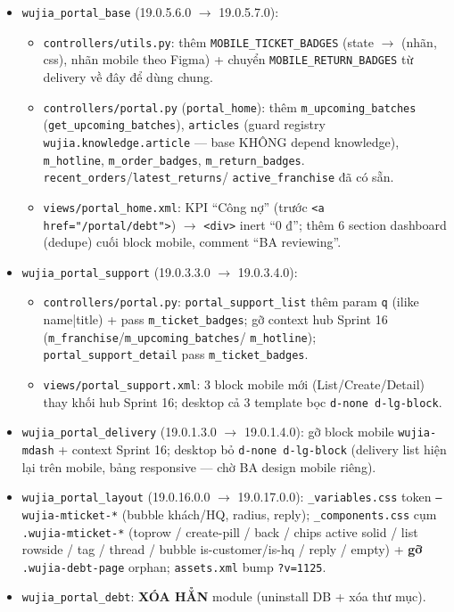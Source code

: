 \begin{itemize}
  \item \texttt{wujia\_portal\_base} (19.0.5.6.0 \(\rightarrow\) 19.0.5.7.0):
    \begin{itemize}
      \item \texttt{controllers/utils.py}: thêm \texttt{MOBILE\_TICKET\_BADGES} (state
            \(\rightarrow\) (nhãn, css), nhãn mobile theo Figma) + chuyển
            \texttt{MOBILE\_RETURN\_BADGES} từ delivery về đây để dùng chung.
      \item \texttt{controllers/portal.py} (\texttt{portal\_home}): thêm
            \texttt{m\_upcoming\_batches} (\texttt{get\_upcoming\_batches}),
            \texttt{articles} (guard registry \texttt{wujia.knowledge.article} ---
            base KHÔNG depend knowledge), \texttt{m\_hotline}, \texttt{m\_order\_badges},
            \texttt{m\_return\_badges}. \texttt{recent\_orders}/\texttt{latest\_returns}/
            \texttt{active\_franchise} đã có sẵn.
      \item \texttt{views/portal\_home.xml}: KPI ``Công nợ'' (trước
            \texttt{<a href="/portal/debt">}) \(\rightarrow\) \texttt{<div>} inert ``0 ₫'';
            thêm 6 section dashboard (dedupe) cuối block mobile, comment ``BA reviewing''.
    \end{itemize}
  \item \texttt{wujia\_portal\_support} (19.0.3.3.0 \(\rightarrow\) 19.0.3.4.0):
    \begin{itemize}
      \item \texttt{controllers/portal.py}: \texttt{portal\_support\_list} thêm param
            \texttt{q} (ilike name|title) + pass \texttt{m\_ticket\_badges}; gỡ context
            hub Sprint 16 (\texttt{m\_franchise}/\texttt{m\_upcoming\_batches}/
            \texttt{m\_hotline}); \texttt{portal\_support\_detail} pass
            \texttt{m\_ticket\_badges}.
      \item \texttt{views/portal\_support.xml}: 3 block mobile mới (List/Create/Detail)
            thay khối hub Sprint 16; desktop cả 3 template bọc \texttt{d-none d-lg-block}.
    \end{itemize}
  \item \texttt{wujia\_portal\_delivery} (19.0.1.3.0 \(\rightarrow\) 19.0.1.4.0): gỡ block
        mobile \texttt{wujia-mdash} + context Sprint 16; desktop bỏ \texttt{d-none
        d-lg-block} (delivery list hiện lại trên mobile, bảng responsive --- chờ BA design
        mobile riêng).
  \item \texttt{wujia\_portal\_layout} (19.0.16.0.0 \(\rightarrow\) 19.0.17.0.0):
        \texttt{\_variables.css} token \texttt{--wujia-mticket-*} (bubble khách/HQ,
        radius, reply); \texttt{\_components.css} cụm \texttt{.wujia-mticket-*} (toprow /
        create-pill / back / chips active solid / list rowside / tag / thread / bubble
        is-customer/is-hq / reply / empty) + \textbf{gỡ} \texttt{.wujia-debt-page} orphan;
        \texttt{assets.xml} bump \texttt{?v=1125}.
  \item \texttt{wujia\_portal\_debt}: \textbf{XÓA HẲN} module (uninstall DB + xóa thư mục).
\end{itemize}


